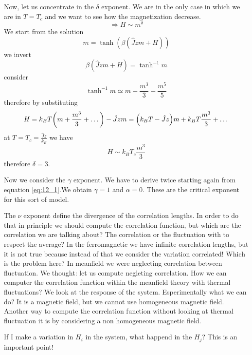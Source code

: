 \documentclass[../main/main.tex]{subfiles}
\begin{document}
Now, let us concentrate in the \( \delta  \) exponent. We are in the only case in which we are in \( T = T_c \) and we want to see how the magnetization decrease.
\begin{equation}
  \Rightarrow H \sim m^ \delta
\end{equation}
We start from the solution
\begin{equation}
  m = \tanh (\beta (\hat{J}zm+H ))
  \label{eq:12_1}
\end{equation}
we invert
\begin{equation}
  \beta (\hat{J}zm+H ) = \tanh^{-1} m
\end{equation}
consider
\begin{equation}
  \tanh^{-1} m \simeq m + \frac{m^3}{3} + \frac{m^5}{5}
\end{equation}
therefore by substituting
\begin{equation}
  H = k_B T \qty(m+ \frac{m^3}{3} + \dots) - \hat{J} z m
    = \qty(k_B T - \hat{J}z) m + k_B T \frac{m^3}{3} + \dots
\end{equation}
at \( T=T_c= \frac{\hat{J}z }{k_B} \)
we have
\begin{equation}
  H \sim k_B T_c \frac{m^3}{3}
\end{equation}
therefore \( \delta =3 \).


Now we consider the \( \gamma   \) exponent. We have to derive twice starting again from equation \eqref{eq:12_1}.We obtain \( \gamma =1  \) and \( \alpha =0 \). These are the critical exponent for this sort of model.

The \( \nu  \) exponent define the divergence of the correlation lengths. In order to do that in principle we should compute the correlation function, but which are the correlation we are talking about? The correlation or the fluctuation with to respect the average? In the ferromagnetic we have infinite correlation lengths, but it is not true because instead of that we consider the variation correlated!
Which is the problem here? In meanfield we were neglecting correlation between fluctuation.
We thought: let us compute negleting correlation.
How we can computer the correlation function within the meanfield theory with thermal fluctuations? We look at the response of the system. Esperimentally what we can do? It is a magnetic field, but we cannot use homogeneous magnetic field. Another way to compute the correlation function without looking at thermal fluctuation it is by considering a non homogeneous magnetic field.

If I make a variation in \( H_i \) in the system, what happend in the \( H_j \)? This is an important point!
\end{document}
